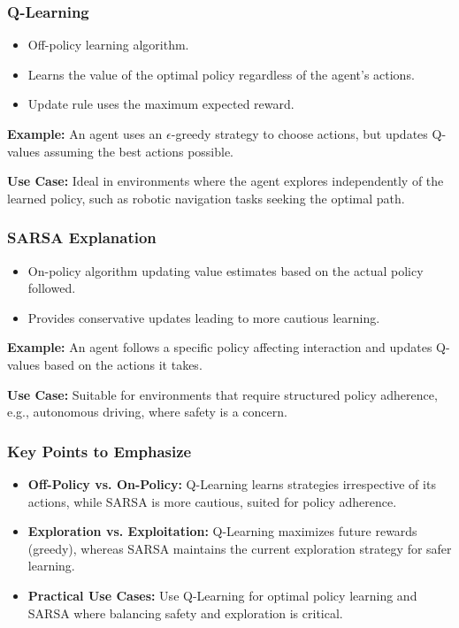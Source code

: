 \documentclass[aspectratio=169]{beamer}
\begin{document}
\begin{frame}[fragile]
    \frametitle{Q-Learning}
    \begin{itemize}
        \item Off-policy learning algorithm.
        \item Learns the value of the optimal policy regardless of the agent's actions.
        \item Update rule uses the maximum expected reward.
    \end{itemize}
    
    \textbf{Example:} An agent uses an $\epsilon$-greedy strategy to choose actions, but updates Q-values assuming the best actions possible.

    \textbf{Use Case:} Ideal in environments where the agent explores independently of the learned policy, such as robotic navigation tasks seeking the optimal path.
\end{frame}

\begin{frame}[fragile]
    \frametitle{SARSA Explanation}
    \begin{itemize}
        \item On-policy algorithm updating value estimates based on the actual policy followed.
        \item Provides conservative updates leading to more cautious learning.
    \end{itemize}
    
    \textbf{Example:} An agent follows a specific policy affecting interaction and updates Q-values based on the actions it takes.

    \textbf{Use Case:} Suitable for environments that require structured policy adherence, e.g., autonomous driving, where safety is a concern.
\end{frame}

\begin{frame}[fragile]
    \frametitle{Key Points to Emphasize}
    \begin{itemize}
        \item \textbf{Off-Policy vs. On-Policy:} 
        Q-Learning learns strategies irrespective of its actions, while SARSA is more cautious, suited for policy adherence.
        
        \item \textbf{Exploration vs. Exploitation:} 
        Q-Learning maximizes future rewards (greedy), whereas SARSA maintains the current exploration strategy for safer learning.
        
        \item \textbf{Practical Use Cases:} 
        Use Q-Learning for optimal policy learning and SARSA where balancing safety and exploration is critical.
    \end{itemize}
\end{frame}
\end{document}
